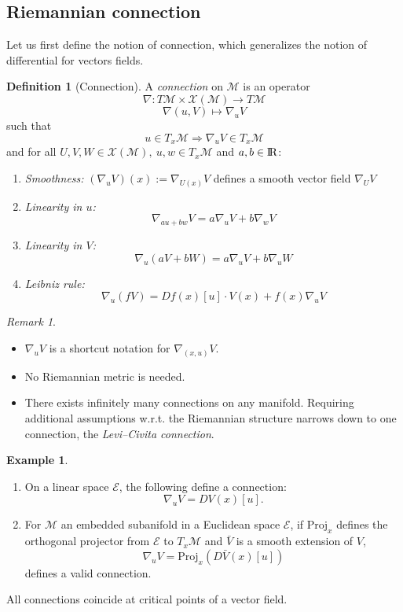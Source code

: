 \documentclass[10pt,a4paper]{book}
\theoremstyle{definition}
\newtheorem{defn}{Definition}[section]
\newtheorem{exm}{Example}[section]
\theoremstyle{plain}
\theoremstyle{remark}
\newtheorem{rmk}{Remark}[section]
\newcommand{\E}{\mathcal{E}}
\newcommand \M {\mathcal{M}}
\newcommand \X {\mathcal{X}}
\def\R{{\rm I\kern-0.16em R}}
\begin{document}
\subsection{Riemannian connection}
Let us first define the notion of connection, which generalizes the notion of differential for vectors fields.
\begin{defn}[Connection]
A \emph{connection} on $\M$ is an operator
$$\nabla: T\M \times \X(\M) \to T\M$$
$$\nabla (u,V) \mapsto \nabla_uV$$
such that 
$$u \in T_x\M \Rightarrow \nabla_uV \in T_x \M$$ and for all $U,V,W\in \X(\M),~u,w\in T_x\M$ and $a,b\in \R$:
\begin{enumerate}
\item \textit{Smoothness:} $(\nabla_uV)(x):=\nabla_{U(x)}V$ defines a smooth vector field $\nabla_U V$
\item \textit{Linearity in $u$:} 
$$\nabla_{au+bw}V=a\nabla_uV+b\nabla_wV$$
\item \textit{Linearity in $V$:}
$$\nabla_u(aV+bW)=a\nabla_uV+b\nabla_u W$$
\item \textit{Leibniz rule:} 
$$\nabla_u(fV)=Df(x)[u]\cdot V(x)+f(x)\nabla_uV$$
\end{enumerate}
\end{defn}
\begin{rmk}~
\begin{itemize}
\item $\nabla_u V$ is a shortcut notation for $\nabla_{(x,u)}V$.
\item No Riemannian metric is needed.
\item There exists infinitely many connections on any manifold. Requiring additional assumptions w.r.t. the Riemannian structure narrows down to one connection, the \emph{Levi--Civita connection}.
\end{itemize}
\end{rmk}
\begin{exm}~
\begin{enumerate}
\item On a linear space $\E$, the following define a connection:
$$\nabla_u V=DV(x)[u].$$
\item For $\M$ an embedded subanifold in a Euclidean space $\E$, if $\text{Proj}_x$ defines the orthogonal projector from $\E$ to $T_x\M$ and $\bar{V}$ is a smooth extension of $V$, 
$$\nabla_u V=\text{Proj}_x(D\bar{V}(x)[u])$$
defines a valid connection.
\end{enumerate}
\end{exm}
All connections coincide at critical points of a vector field.
\end{document}
